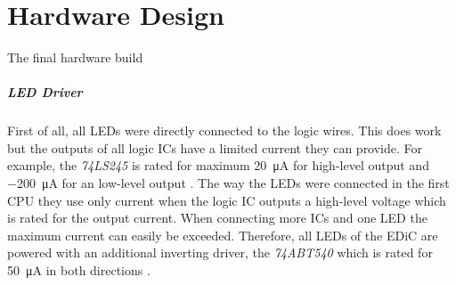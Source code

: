 \chapter{Hardware Design}\label{cha:hardware}
The final hardware build \TODO{}

\paragraph{LED Driver}
First of all, all \glspl{LED} were directly connected to the logic wires.
This does work but the outputs of all logic \glspl{IC} have a limited current they can provide.
For example, the \emph{74LS245} is rated for maximum \qty{20}{\uA} for high-level output and \qty{-200}{\micro\ampere} for an low-level output \cite{74ls245}.
The way the \glspl{LED} were connected in the first \gls{CPU} they use only current when the logic \gls{IC} outputs a high-level voltage which is rated for  the output current.
When connecting more \glspl{IC} and one \gls{LED} the maximum current can easily be exceeded.
Therefore, all \glspl{LED} of the \gls{EDiC} are powered with an additional inverting driver, the \emph{74ABT540} which is rated for \qty{50}{\uA} in both directions \cite{74abt540}.
